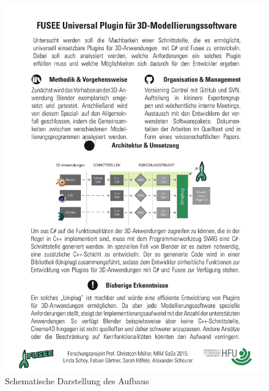 \begin{figure}[htbp]
\center
\includegraphics[width=1\textwidth]{images/aufbau}
\caption{Schematische Darstellung des Aufbaus}
\label{fig:aufbau}
\end{figure}